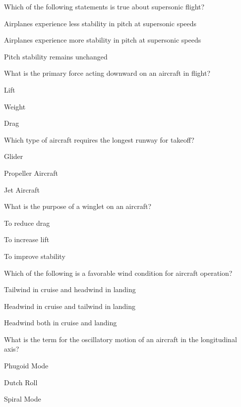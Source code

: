 \begin{enhancedmcq}{Which of the following statements is true about supersonic flight?}
\item Airplanes experience less stability in pitch at supersonic speeds
\item Airplanes experience more stability in pitch at supersonic speeds
\item Pitch stability remains unchanged

\end{enhancedmcq}
\begin{enhancedmcq}{What is the primary force acting downward on an aircraft in flight?}
\item Lift
\item Weight
\item Drag

\end{enhancedmcq}
\begin{enhancedmcq}{Which type of aircraft requires the longest runway for takeoff?}
\item Glider
\item Propeller Aircraft
\item Jet Aircraft

\end{enhancedmcq}
\begin{enhancedmcq}{What is the purpose of a winglet on an aircraft?}
\item To reduce drag
\item To increase lift
\item To improve stability

\end{enhancedmcq}
\begin{enhancedmcq}{Which of the following is a favorable wind condition for aircraft operation?}
\item Tailwind in cruise and headwind in landing
\item Headwind in cruise and tailwind in landing
\item Headwind both in cruise and landing

\end{enhancedmcq}
\begin{enhancedmcq}{What is the term for the oscillatory motion of an aircraft in the longitudinal axis?}
\item Phugoid Mode
\item Dutch Roll
\item Spiral Mode

\end{enhancedmcq}
